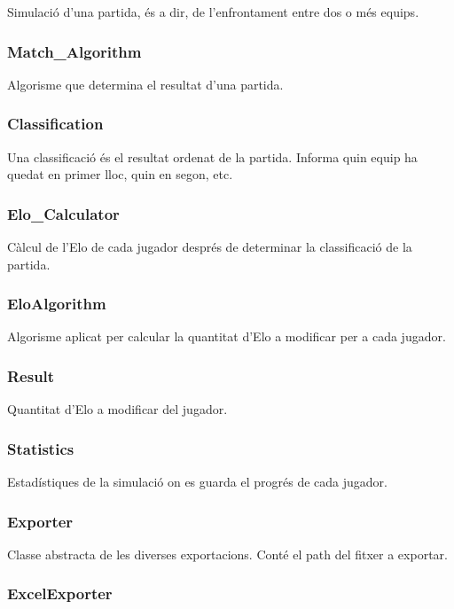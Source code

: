 \documentclass[a4paper]{article}
\begin{document}
Simulació d'una partida, és a dir, de l'enfrontament entre dos o més equips.

\subsubsection*{Match\_Algorithm}

Algorisme que determina el resultat d'una partida.

\subsubsection*{Classification}

Una classificació és el resultat ordenat de la partida. Informa quin equip ha quedat en primer lloc, quin en segon, etc.

\subsubsection*{Elo\_Calculator}

Càlcul de l'Elo de cada jugador després de determinar la classificació de la partida.

\subsubsection*{EloAlgorithm}

Algorisme aplicat per calcular la quantitat d'Elo a modificar per a cada jugador.

\subsubsection*{Result}

Quantitat d'Elo a modificar del jugador.

\subsubsection*{Statistics}

Estadístiques de la simulació on es guarda el progrés de cada jugador.

\subsubsection*{Exporter}

Classe abstracta de les diverses exportacions. Conté el path del fitxer a exportar.

\subsubsection*{ExcelExporter}
\end{document}
